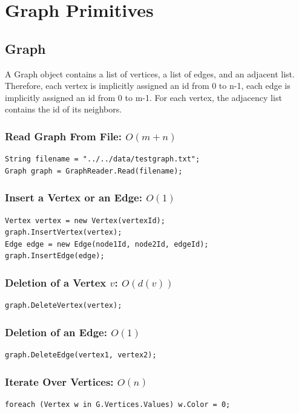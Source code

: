 \documentclass{article}
\begin{document}
\lstset{style=sharpc}

\section{Graph Primitives}

\subsection{Graph}

A Graph object contains a list of vertices, a list of edges, and an adjacent list. Therefore, each vertex is implicitly assigned an id from 0 to n-1, each edge is implicitly assigned an id from 0 to m-1. For each vertex, the adjacency list contains the id of its neighbors.
 
\subsubsection{Read Graph From File: $O(m+n)$}
\begin{lstlisting}
String filename = "../../data/testgraph.txt";
Graph graph = GraphReader.Read(filename); 
\end{lstlisting}


\subsubsection{Insert a Vertex or an Edge: $O(1)$}
\begin{lstlisting}
Vertex vertex = new Vertex(vertexId);
graph.InsertVertex(vertex);
Edge edge = new Edge(node1Id, node2Id, edgeId);
graph.InsertEdge(edge);
\end{lstlisting}


\subsubsection{Deletion of a Vertex $v$: $O(d(v))$}
\begin{lstlisting}
graph.DeleteVertex(vertex);
\end{lstlisting}

\subsubsection{Deletion of an Edge: $O(1)$}
\begin{lstlisting}
graph.DeleteEdge(vertex1, vertex2);
\end{lstlisting}

\subsubsection{Iterate Over Vertices: $O(n)$}
\begin{lstlisting}
foreach (Vertex w in G.Vertices.Values) w.Color = 0;
\end{lstlisting}
\end{document}
